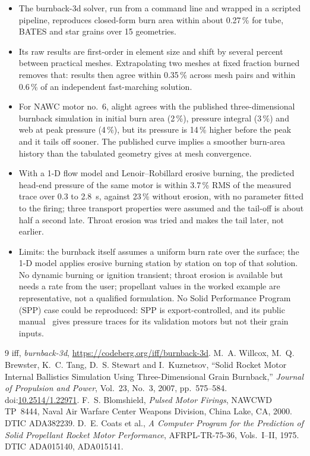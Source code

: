 \documentclass[10pt,a4paper]{article}
\begin{document}
\begin{itemize}[leftmargin=1.4em,itemsep=0pt,topsep=1pt]
\item The burnback-3d solver, run from a command line and wrapped in a scripted pipeline, reproduces
  closed-form burn area within about 0.27\,\% for tube, BATES and star grains over 15
  geometries.
\item Its raw results are first-order in element size and shift by several percent between
  practical meshes. Extrapolating two meshes at fixed fraction burned removes that: results then
  agree within 0.35\,\% across mesh pairs and within 0.6\,\% of an independent fast-marching
  solution.
\item For NAWC motor no.~6, alight agrees with the published three-dimensional burnback simulation in initial burn area (2\,\%), pressure integral (3\,\%) and web at peak pressure (4\,\%), but its pressure is 14\,\% higher before the peak and it tails off sooner. The published curve implies a smoother burn-area history than the tabulated geometry gives at mesh convergence.
\item With a 1-D flow model and Lenoir--Robillard erosive burning, the predicted head-end pressure of the same motor is within 3.7\,\% RMS of the measured trace over 0.3 to \SI{2.8}{s}, against 23\,\% without erosion, with no parameter fitted to the firing; three transport properties were assumed and the tail-off is about half a second late. Throat erosion was tried and makes the tail later, not earlier.
\item Limits: the burnback itself assumes a uniform burn rate over the surface; the 1-D model applies
  erosive burning station by station on top of that solution. No dynamic burning or ignition transient; throat erosion is available but needs a rate from the user; propellant values in the worked example
  are representative, not a qualified formulation. No Solid Performance Program (SPP) case could be
  reproduced: SPP is export-controlled, and its public manual~\cite{spp} gives pressure traces for
  its validation motors but not their grain inputs.
\end{itemize}

\begin{thebibliography}{9}\small
{} iff, \emph{burnback-3d}, \url{https://codeberg.org/iff/burnback-3d}.
 M.~A. Willcox, M.~Q. Brewster, K.~C. Tang, D.~S. Stewart and I.~Kuznetsov,
  ``Solid Rocket Motor Internal Ballistics Simulation Using Three-Dimensional Grain Burnback,''
  \emph{Journal of Propulsion and Power}, Vol.~23, No.~3, 2007, pp.~575--584.
  doi:\href{https://doi.org/10.2514/1.22971}{10.2514/1.22971}.
 F.~S. Blomshield, \emph{Pulsed Motor Firings}, NAWCWD TP~8444, Naval Air
  Warfare Center Weapons Division, China Lake, CA, 2000. DTIC ADA382239.
 D.~E. Coats et al., \emph{A Computer Program for the Prediction of Solid Propellant
  Rocket Motor Performance}, AFRPL-TR-75-36, Vols.~I--II, 1975. DTIC ADA015140, ADA015141.
\end{thebibliography}
\end{document}
